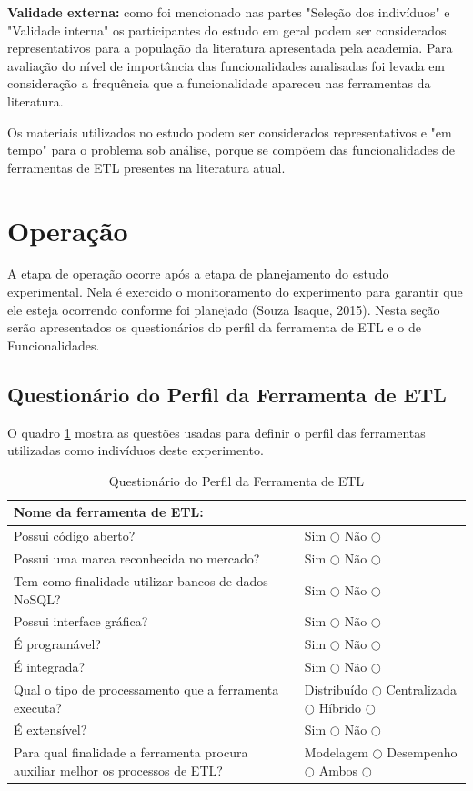 \textbf{Validade externa:} como foi mencionado nas partes "Seleção dos indivíduos" e "Validade interna" os participantes do estudo em geral podem ser considerados representativos para a população da literatura apresentada pela academia. Para avaliação do nível de importância das funcionalidades analisadas foi levada em consideração a frequência que a funcionalidade apareceu nas ferramentas da literatura.

Os materiais utilizados no estudo podem ser considerados representativos e "em tempo" para o problema sob análise, porque se compõem das funcionalidades de ferramentas de ETL presentes na literatura atual.

\section{Operação}

A etapa de operação ocorre após a etapa de planejamento do estudo experimental. Nela é exercido o monitoramento do experimento para garantir que ele esteja ocorrendo conforme foi planejado (Souza Isaque, 2015). Nesta seção serão apresentados os questionários do perfil da ferramenta de ETL e o de Funcionalidades.

\subsection{Questionário do Perfil da Ferramenta de ETL}

O quadro \ref{questionarioperfil} mostra as questões usadas para definir o perfil das ferramentas utilizadas como indivíduos deste experimento.

\begin{table}[ht]
	\centering
	\caption{Questionário do Perfil da Ferramenta de ETL}
	\label{questionarioperfil}
	\begin{tabular}{|p{8cm}| p{8cm}| }
		\hline
		Nome da ferramenta de ETL: & \\
		\hline
		Possui código aberto? & Sim $\bigcirc$ Não $\bigcirc$ \\
		\hline
		Possui uma marca reconhecida no mercado? & Sim $\bigcirc$ Não $\bigcirc$ \\
		\hline
		Tem como finalidade utilizar bancos de dados NoSQL? &  Sim $\bigcirc$ Não $\bigcirc$ \\
		\hline
		Possui interface gráfica? & Sim $\bigcirc$ Não $\bigcirc$ \\
		\hline
		É programável?  & Sim $\bigcirc$ Não $\bigcirc$ \\
		\hline
		É integrada? & Sim $\bigcirc$ Não $\bigcirc$ \\
		\hline
		Qual o tipo de processamento que a ferramenta executa? & Distribuído  $\bigcirc$  Centralizada  $\bigcirc$  Híbrido  $\bigcirc$ \\
		\hline
		É extensível? & Sim $\bigcirc$ Não $\bigcirc$ \\
		\hline
		Para qual finalidade a ferramenta procura auxiliar melhor os processos de ETL? & Modelagem $\bigcirc$ Desempenho $\bigcirc$ Ambos $\bigcirc$ \\
		\hline
		
		
	\end{tabular}
\end{table}


